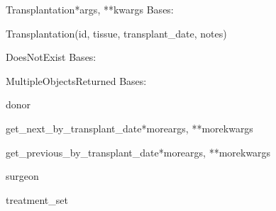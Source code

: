 \documentclass[letterpaper,10pt,english]{sphinxmanual}
\begin{document}
\hypertarget{data.models.Transplantation}{}\begin{classdesc}{Transplantation}{*args, **kwargs}
Bases: 

Transplantation(id, tissue, transplant\_date, notes)

\hypertarget{data.models.Transplantation.DoesNotExist}{}\begin{excdesc}{DoesNotExist}
Bases: 
\end{excdesc}

\hypertarget{data.models.Transplantation.MultipleObjectsReturned}{}\begin{excdesc}{MultipleObjectsReturned}
Bases: 
\end{excdesc}

\hypertarget{data.models.Transplantation.donor}{}\begin{memberdesc}[Transplantation]{donor}\end{memberdesc}

\hypertarget{data.models.Transplantation.get_next_by_transplant_date}{}\begin{methoddesc}[Transplantation]{get\_next\_by\_transplant\_date}{*moreargs, **morekwargs}\end{methoddesc}

\hypertarget{data.models.Transplantation.get_previous_by_transplant_date}{}\begin{methoddesc}[Transplantation]{get\_previous\_by\_transplant\_date}{*moreargs, **morekwargs}\end{methoddesc}

\hypertarget{data.models.Transplantation.surgeon}{}\begin{memberdesc}[Transplantation]{surgeon}\end{memberdesc}

\hypertarget{data.models.Transplantation.treatment_set}{}\begin{memberdesc}[Transplantation]{treatment\_set}\end{memberdesc}
\end{classdesc}
\end{document}
